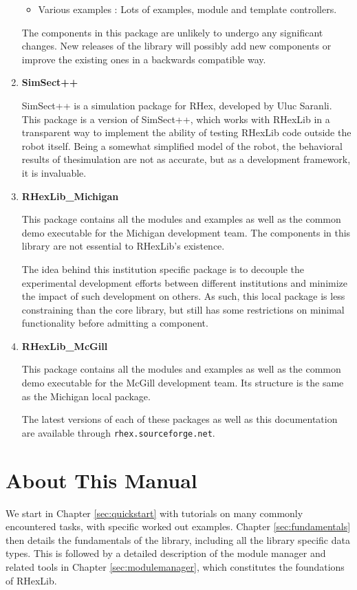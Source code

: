 \begin{enumerate}
\begin{itemize}
\item{Various examples : Lots of examples, module and template controllers.}
\end{itemize}

The components in this package are unlikely to undergo any significant
changes. New releases of the library will possibly add new components or
improve the existing ones in a backwards compatible way.

\item{\bf SimSect++}\par

SimSect++ is a simulation package for RHex, developed by Uluc Saranli. This
package is a version of SimSect++, which works with RHexLib in a transparent
way to implement the ability of testing RHexLib code outside the robot
itself. Being a somewhat simplified model of the robot, the behavioral
results of thesimulation are not as accurate, but as a development
framework, it is invaluable.

\item{\bf RHexLib\_Michigan}\par
This package contains all the modules and examples as well as the common
demo executable for the Michigan development team. The components in this
library are not essential to RHexLib's existence.

The idea behind this institution specific package is to decouple the
experimental development efforts between different institutions and minimize
the impact of such development on others. As such, this local package is
less constraining than the core library, but still has some restrictions on
minimal functionality before admitting a component.

\item{\bf RHexLib\_McGill}\par
This package contains all the modules and examples as well as the common
demo executable for the McGill development team. Its structure is the same
as the Michigan local package.

The latest versions of each of these packages as well as this documentation
are available through {\tt rhex.sourceforge.net}.
\end{enumerate}

\section{About This Manual}

We start in Chapter \ref{sec:quickstart} with tutorials on many commonly
encountered tasks, with specific worked out examples. Chapter
\ref{sec:fundamentals} then details the fundamentals of the library,
including all the library specific data types. This is followed by a
detailed description of the module manager and related tools in Chapter
\ref{sec:modulemanager}, which constitutes the foundations of RHexLib.

